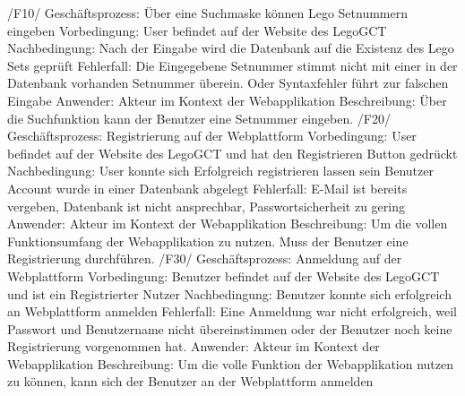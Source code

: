 /F10/ \newline
Geschäftsprozess: Über eine Suchmaske können Lego Setnummern eingeben\newline
Vorbedingung: User befindet auf der Website des LegoGCT\newline
Nachbedingung: Nach der Eingabe wird die Datenbank auf die Existenz des Lego Sets geprüft\newline
Fehlerfall: Die Eingegebene Setnummer stimmt nicht mit einer in der Datenbank vorhanden Setnummer überein. Oder Syntaxfehler führt zur falschen Eingabe\newline
Anwender: Akteur im Kontext der Webapplikation\newline
Beschreibung: Über die Suchfunktion kann der Benutzer eine Setnummer eingeben.\newline\newline
/F20/\newline
Geschäftsprozess: Registrierung auf der Webplattform\newline
Vorbedingung: User befindet auf der Website des LegoGCT und hat den Registrieren Button gedrückt\newline
Nachbedingung: User konnte sich Erfolgreich registrieren lassen sein Benutzer Account wurde in einer Datenbank abgelegt\newline
Fehlerfall: E-Mail ist bereits vergeben, Datenbank ist nicht ansprechbar, Passwortsicherheit zu gering\newline
Anwender: Akteur im Kontext der Webapplikation\newline
Beschreibung: Um die vollen Funktionsumfang der Webapplikation zu nutzen. Muss der Benutzer eine Registrierung durchführen.\newline\newline
/F30/\newline
Geschäftsprozess: Anmeldung auf der Webplattform\newline
Vorbedingung: Benutzer befindet auf der Website des LegoGCT und ist ein Registrierter Nutzer\newline
Nachbedingung: Benutzer konnte sich erfolgreich an Webplattform anmelden\newline
Fehlerfall: Eine Anmeldung war nicht erfolgreich, weil Passwort und Benutzername nicht übereinstimmen oder der Benutzer noch keine Registrierung vorgenommen hat.\newline
Anwender: Akteur im Kontext der Webapplikation\newline
Beschreibung: Um die volle Funktion der Webapplikation nutzen zu können, kann sich der Benutzer an der Webplattform anmelden\newline\newline
